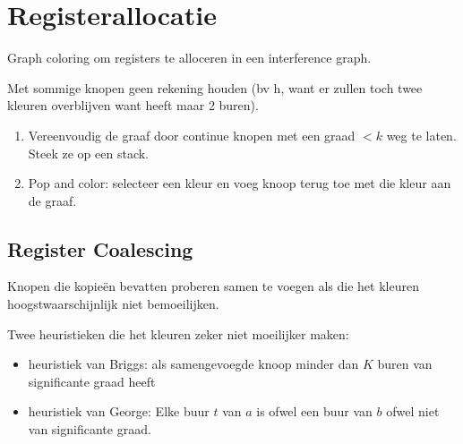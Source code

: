 \chapter{Registerallocatie}
Graph coloring om registers te alloceren in een interference graph.


Met sommige knopen geen rekening houden (bv h, want er zullen toch twee kleuren overblijven want heeft maar 2 buren).

\begin{enumerate}
	\item Vereenvoudig de graaf door continue knopen met een graad $< k$ weg te laten. Steek ze op een stack.
	\item Pop and color: selecteer een kleur en voeg knoop terug toe met die kleur aan de graaf.
\end{enumerate} 

\section{Register Coalescing}
Knopen die kopieën bevatten proberen samen te voegen als die het kleuren hoogstwaarschijnlijk niet bemoeilijken.

Twee heuristieken die het kleuren zeker niet moeilijker maken:
\begin{itemize}
	\item heuristiek van Briggs: als samengevoegde knoop minder dan $K$ buren van significante graad heeft
	\item heuristiek van George: Elke buur $t$ van $a$ is ofwel een buur van $b$ ofwel niet van significante graad.
\end{itemize}
